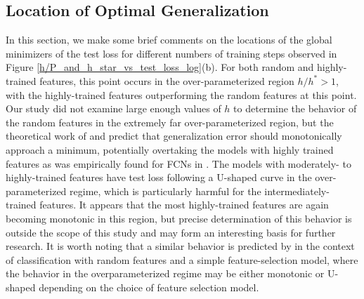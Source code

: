 \documentclass[11pt]{article}
\begin{document}
\subsection{Location of Optimal Generalization}

In this section, we make some brief comments on the locations of the global minimizers of the test loss for different numbers of training steps observed in Figure \ref{h/P_and_h_star_vs_test_loss_log}(b). For both random and highly-trained features, this point occurs in the over-parameterized region $h/h^* > 1$, with the highly-trained features outperforming the random features at this point. Our study did not examine large enough values of $h$ to determine the behavior of the random features in the extremely far over-parameterized region, but the theoretical work of \cite{meiGeneralizationErrorRandom2019} and \cite{dengModelDoubleDescent2020} predict that generalization error should monotonically approach a minimum, potentially overtaking the models with highly trained features as was empirically found for FCNs in \cite{geigerDisentanglingFeatureLazy2020}. The models with moderately- to highly-trained features have test loss following a U-shaped curve in the over-parameterized regime, which is particularly harmful for the intermediately-trained features. It appears that the most highly-trained features are again becoming monotonic in this region, but precise determination of this behavior is outside the scope of this study and may form an interesting basis for further research. It is worth noting that a similar behavior is predicted by \cite{dengModelDoubleDescent2020} in the context of classification with random features and a simple feature-selection model, where the behavior in the overparameterized regime may be either monotonic or U-shaped depending on the choice of feature selection model.\\
\end{document}
